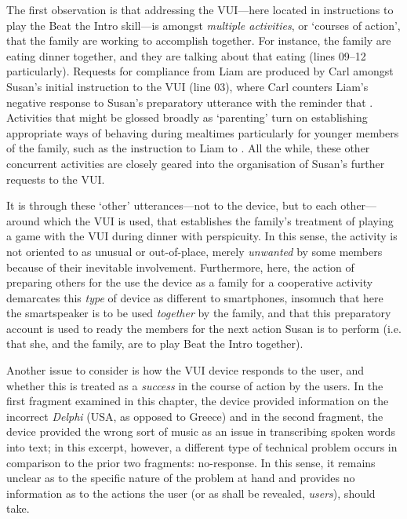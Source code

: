 The first observation is that addressing the \ac{VUI}---here located in instructions to play the Beat the Intro skill---is  amongst \textit{multiple activities}, or `courses of action', that the family are working to accomplish together.
For instance, the family are eating dinner together, and they are talking about that eating (lines 09--12 particularly).
Requests for compliance from Liam are produced by Carl amongst Susan's initial instruction to the \ac{VUI} (line 03), where Carl counters Liam's negative response to Susan's preparatory utterance  with the reminder that .
Activities that might be glossed broadly as `parenting' turn on establishing appropriate ways of behaving during mealtimes particularly for younger members of the family, such as the instruction to Liam to .
All the while, these other concurrent activities are closely geared into the organisation of Susan's further requests to the \ac{VUI}.

\begin{revisedsubmission}
It is through these `other' utterances---not to the device, but to each other---around which the \ac{VUI} is used, that establishes the family's treatment of playing a game with the \ac{VUI} during dinner with perspicuity.
In this sense, the activity is not oriented to as unusual or out-of-place, merely \textit{unwanted} by some members because of their inevitable involvement.
Furthermore, here, the action of preparing others for the use the device as a family for a cooperative activity demarcates this \textit{type} of device as different to smartphones, insomuch that here the smartspeaker is to be used \textit{together} by the family, and that this preparatory account is used to ready the members for the next action Susan is to perform (i.e. that she, and the family, are to play Beat the Intro together).

Another issue to consider is how the \ac{VUI} device responds to the user, and whether this is treated as a \textit{success} in the course of action by the users.
In the first fragment examined in this chapter, the device provided information on the incorrect \textit{Delphi} (USA, as opposed to Greece) and in the second fragment, the device provided the wrong sort of music as an issue in transcribing spoken words into text; in this excerpt, however, a different type of technical problem occurs in comparison to the prior two fragments: no-response.
In this sense, it remains unclear as to the specific nature of the problem at hand and provides no information as to the actions the user (or as shall be revealed, \textit{users}), should take.
\end{revisedsubmission}

